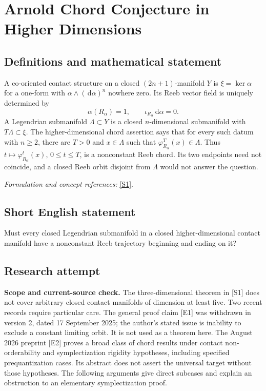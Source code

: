 \documentclass[11pt]{article}
\begin{document}
\section*{\texorpdfstring{Arnold Chord Conjecture in Higher Dimensions}{Arnold Chord Conjecture in Higher Dimensions}}\label{331}
\subsection{Definitions and mathematical statement}
A co-oriented contact structure on a closed $(2n+1)$-manifold $Y$ is $\xi=\ker\alpha$ for a one-form with $\alpha\wedge({\,\mathrm{d}}\alpha)^n$ nowhere zero. Its Reeb vector field is uniquely determined by
\[
 \alpha(R_\alpha)=1,\qquad \iota_{R_\alpha}{\,\mathrm{d}}\alpha=0.
\]
A Legendrian submanifold $\Lambda\subset Y$ is a closed $n$-dimensional submanifold with $T\Lambda\subset\xi$. The higher-dimensional chord assertion says that for every such datum with $n\ge2$, there are $T>0$ and $x\in\Lambda$ such that $\varphi_{R_\alpha}^T(x)\in\Lambda$. Thus $t\mapsto\varphi_{R_\alpha}^t(x)$, $0\le t\le T$, is a nonconstant Reeb chord. Its two endpoints need not coincide, and a closed Reeb orbit disjoint from $\Lambda$ would not answer the question.
\par\smallskip\textit{Formulation and concept references:} \href{https://arxiv.org/abs/1004.4319}{[S1]}.

\subsection{Short English statement}
Must every closed Legendrian submanifold in a closed higher-dimensional contact manifold have a nonconstant Reeb trajectory beginning and ending on it?
\subsection{Research attempt}
\textbf{Scope and current-source check.}
The three-dimensional theorem in [S1] does not cover arbitrary closed contact
manifolds of dimension at least five.  Two recent records require particular
care.  The general proof claim [E1] was withdrawn in version 2, dated
17 September 2025; the author's stated issue is inability to exclude a
constant limiting orbit.  It is not used as a theorem here.  The August 2026
preprint [E2] proves a broad class of chord results under contact
non-orderability and symplectization rigidity hypotheses, including specified
prequantization cases.  Its abstract does not assert the universal target
without those hypotheses.  The following arguments give direct subcases and
explain an obstruction to an elementary symplectization proof.
\end{document}
